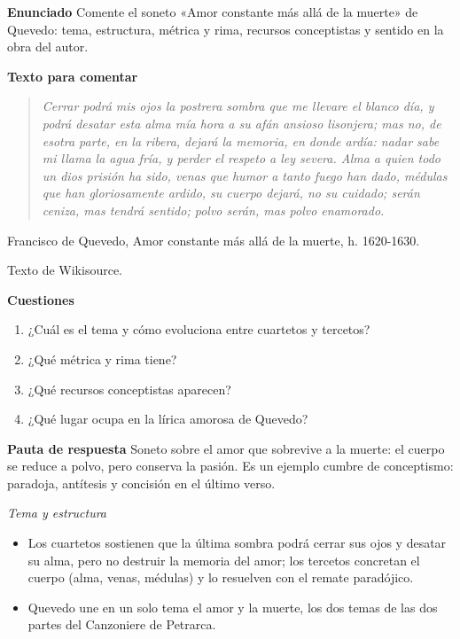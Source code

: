 \documentclass{book}
\begin{document}
\begin{tcolorbox}[title={Ejercicio resuelto}, studiumworked, breakable]

\noindent\textbf{Enunciado}
Comente el soneto «Amor constante más allá de la muerte» de Quevedo: tema, estructura, métrica y rima, recursos conceptistas y sentido en la obra del autor.


\noindent\textbf{Texto para comentar}

\begin{quote}
\itshape Cerrar podrá mis ojos la postrera sombra que me llevare el blanco día, y podrá desatar esta alma mía hora a su afán ansioso lisonjera; mas no, de esotra parte, en la ribera, dejará la memoria, en donde ardía: nadar sabe mi llama la agua fría, y perder el respeto a ley severa. Alma a quien todo un dios prisión ha sido, venas que humor a tanto fuego han dado, médulas que han gloriosamente ardido, su cuerpo dejará, no su cuidado; serán ceniza, mas tendrá sentido; polvo serán, mas polvo enamorado.
\end{quote}
{\noindent\footnotesize Francisco de Quevedo, Amor constante más allá de la muerte, h. 1620-1630.\par}
{\noindent\footnotesize Texto de Wikisource.\par}

\noindent\textbf{Cuestiones}
\begin{enumerate}
\item ¿Cuál es el tema y cómo evoluciona entre cuartetos y tercetos?
\item ¿Qué métrica y rima tiene?
\item ¿Qué recursos conceptistas aparecen?
\item ¿Qué lugar ocupa en la lírica amorosa de Quevedo?
\end{enumerate}

\noindent\textbf{Pauta de respuesta}
Soneto sobre el amor que sobrevive a la muerte: el cuerpo se reduce a polvo, pero conserva la pasión. Es un ejemplo cumbre de conceptismo: paradoja, antítesis y concisión en el último verso.


\noindent\textit{Tema y estructura}
\begin{itemize}
\item Los cuartetos sostienen que la última sombra podrá cerrar sus ojos y desatar su alma, pero no destruir la memoria del amor; los tercetos concretan el cuerpo (alma, venas, médulas) y lo resuelven con el remate paradójico.
\item Quevedo une en un solo tema el amor y la muerte, los dos temas de las dos partes del Canzoniere de Petrarca.
\end{itemize}


\end{tcolorbox}
\end{document}
